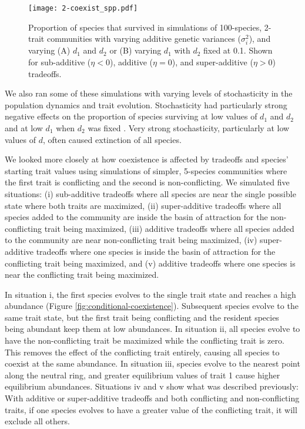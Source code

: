 \begin{figure}[ht!]
\centering
\texttt{[image: 2-coexist\_spp.pdf]}
\caption{Proportion of species that survived in simulations of 100-species, 2-trait
    communities with varying additive genetic variances ($\sigma_i^2$), and 
    varying (A) $d_1$ and $d_2$ or (B) varying $d_1$ with $d_2$ fixed at 0.1.
    Shown for sub-additive ($\eta < 0$), additive ($\eta = 0$), and 
    super-additive ($\eta > 0$) tradeoffs.}
\label{fig:coexistence-spp}
\end{figure}


We also ran some of these simulations with varying levels of stochasticity
in the population dynamics and trait evolution.
Stochasticity had particularly strong negative effects on the proportion
of species surviving at low values of $d_1$ and $d_2$ and at low $d_1$
when $d_2$ was fixed \label{fig:stoch-coexist-nspp}.
Very strong stochasticity, particularly at low values of $d$, often caused
extinction of all species.



We looked more closely at how coexistence is affected by tradeoffs and 
species' starting trait values
using simulations of simpler, 5-species communities where the first 
trait is conflicting and the second is non-conflicting.
We simulated five situations:
(i) sub-additive tradeoffs where all species are near the single
possible state where both traits are maximized,
(ii) super-additive tradeoffs where all species added to the community
are inside the basin of attraction for the non-conflicting trait
being maximized,
(iii) additive tradeoffs where all species added to the community
are near non-conflicting trait being maximized,
(iv) super-additive tradeoffs where one species is
inside the basin of attraction for the conflicting trait
being maximized,
and
(v) additive tradeoffs where one species is near the conflicting 
trait being maximized.

In situation i, the first species evolves to the single
trait state and reaches a high abundance (Figure
\ref{fig:conditional-coexistence}).
Subsequent species evolve to the same trait state, but the first trait
being conflicting and the resident species being abundant keep them
at low abundances.
In situation ii, all species evolve to have the non-conflicting trait
be maximized while the conflicting trait is zero.
This removes the effect of the conflicting trait entirely, causing all
species to coexist at the same abundance.
In situation iii, species evolve to the nearest point along the
neutral ring, and greater equilibrium values of trait 1 cause
higher equilibrium abundances.
Situations iv and v show what was described previously:
With additive or super-additive tradeoffs and both conflicting
and non-conflicting traits, if one species evolves to have a greater
value of the conflicting trait, it will exclude all others.


